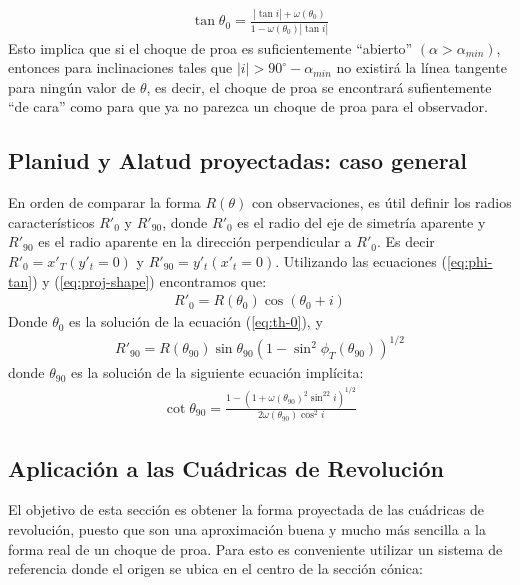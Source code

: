 \begin{align}
  \tan\theta_0 = \frac{|\tan i| + \omega(\theta_0)}{1 - \omega(\theta_0)|\tan i|}
  \label{eq:th-0}
\end{align}
Esto implica que si el choque de proa es suficientemente ``abierto'' $(\alpha > \alpha_{min})$, entonces para inclinaciones tales que
$|i| > 90^\circ - \alpha_{min}$ no existirá la línea tangente para ningún valor de $\theta$, es decir, el choque de proa se encontrará sufientemente ``de cara'' como para que ya no parezca un choque de proa para el observador.

\subsection{Planiud y Alatud proyectadas: caso general}

En orden de comparar la forma $R(\theta)$ con observaciones, es útil definir los radios característicos $R'_0$ y $R'_{90}$, donde $R'_0$ es el radio del eje de simetría aparente y $R'_{90}$ es el radio aparente en la dirección perpendicular a $R'_0$. Es decir
$R'_0 = x'_T(y'_t=0)$ y $R'_{90} = y'_t(x'_t = 0)$. Utilizando las ecuaciones (\ref{eq:phi-tan}) y (\ref{eq:proj-shape}) encontramos que:
\begin{align}
R'_0 = R(\theta_0)\cos(\theta_0 + i)
\label{eq:R0p}
\end{align}
Donde $\theta_0$ es la solución de la ecuación (\ref{eq:th-0}), y
\begin{align}
  R'_{90} = R(\theta_{90})\sin\theta_{90}\left(1-\sin^2\phi_T(\theta_{90})\right)^{1/2}
  \label{eq:R90p}
\end{align}
donde $\theta_{90}$ es la solución de la siguiente ecuación implícita:
\begin{align}
  \cot\theta_{90} = \frac{1 - \left(1+\omega(\theta_{90})^2\sin^22i\right)^{1/2}}
  {2\omega(\theta_{90})\cos^2i}
  \label{eq:th90}
\end{align}

\subsection{Aplicación a las Cuádricas de Revolución}

El objetivo de esta sección es obtener la forma proyectada de las cuádricas de revolución, puesto que son una aproximación buena y mucho más sencilla a la forma real de un choque de proa. Para esto es conveniente utilizar un sistema de referencia donde el origen se ubica en el centro de la sección cónica:

